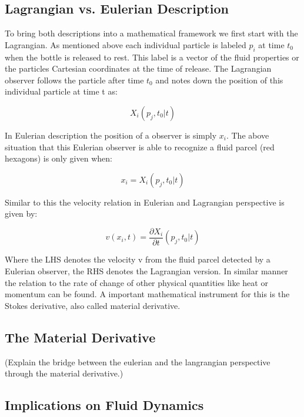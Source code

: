 \subsection{Lagrangian vs. Eulerian Description}
To bring both descriptions into a mathematical framework we first start with the Lagrangian. As mentioned above each individual particle is labeled $p_{i}$ at time $t_{0}$ when the bottle is released to rest. This label is a vector of the fluid properties or the particles Cartesian coordinates at the time of release. The Lagrangian observer follows the particle after time $t_{0}$ and notes down the position of this individual particle at time t as:

\begin{equation}
X_{i}(p_{j}, t_{0} | t)
\end{equation}

In Eulerian description the position of a observer is simply $x_{i}$. The above situation that this Eulerian observer is able to recognize a fluid parcel (red hexagons) is only given when:

\begin{equation}
x_{i} = X_{i}(p_{j}, t_{0} | t)
\end{equation}

Similar to this the velocity relation in Eulerian and Lagrangian perspective is given by:

\begin{equation}
v(x_{i},t) = \frac{\partial X_{i}}{\partial t} (p_{j}, t_{0} | t)
\end{equation}

Where the LHS denotes the velocity v from the fluid parcel detected by a Eulerian observer, the RHS denotes the Lagrangian version. In similar manner the relation to the rate of change of other physical quantities like heat or momentum can be found. A important mathematical instrument for this is the Stokes derivative, also called material derivative.

\subsection{The Material Derivative}

(Explain the bridge between the eulerian and the langrangian perspective through the material derivative.)

\subsection{Implications on Fluid Dynamics}

